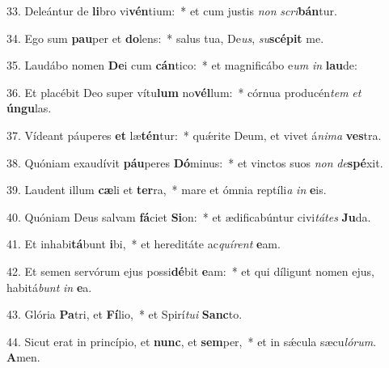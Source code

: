 33. Deleántur de \textbf{li}bro vi\textbf{vén}tium:~*  et cum justis \textit{non} \textit{scri}\textbf{bán}tur.\

34. Ego sum \textbf{pau}per et \textbf{do}lens:~*  salus tua, De\textit{us}, \textit{su}\textbf{scé}\textbf{pit} me.\

35. Laudábo nomen \textbf{De}i cum \textbf{cán}tico:~*  et magnificábo e\textit{um} \textit{in} \textbf{lau}de:\

36. Et placébit Deo super vítu\textbf{lum} no\textbf{vél}lum:~*  córnua producén\textit{tem} \textit{et} \textbf{ún}\textbf{gu}las.\

37. Vídeant páuperes \textbf{et} læ\textbf{tén}tur:~*  quǽrite Deum, et vivet á\textit{ni}\textit{ma} \textbf{ves}tra.\

38. Quóniam exaudívit \textbf{páu}peres \textbf{Dó}minus:~*  et vinctos suos \textit{non} \textit{de}\textbf{spé}xit.\

39. Laudent illum \textbf{cæ}li et \textbf{ter}ra,~*  mare et ómnia reptíli\textit{a} \textit{in} \textbf{e}is.\

40. Quóniam Deus salvam \textbf{fá}ciet \textbf{Si}on:~*  et ædificabúntur civi\textit{tá}\textit{tes} \textbf{Ju}da.\

41. Et inhabi\textbf{tá}bunt \textbf{i}bi,~*  et hereditáte ac\textit{quí}\textit{rent} \textbf{e}am.\

42. Et semen servórum ejus possi\textbf{dé}bit \textbf{e}am:~*  et qui díligunt nomen ejus, habitá\textit{bunt} \textit{in} \textbf{e}a.\

43. Glória \textbf{Pa}tri, et \textbf{Fí}lio,~*  et Spirí\textit{tu}\textit{i} \textbf{Sanc}to.\

44. Sicut erat in princípio, et \textbf{nunc}, et \textbf{sem}per,~*  et in sǽcula sæcu\textit{ló}\textit{rum}. \textbf{A}men.\

